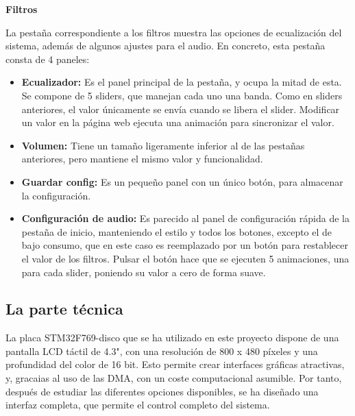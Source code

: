 \textbf{Filtros}

La pestaña correspondiente a los filtros muestra las opciones de ecualización del sistema, además de algunos ajustes para el audio. En concreto, esta pestaña consta de 4 paneles: 
\begin{itemize}
    \item \textbf{Ecualizador:} Es el panel principal de la pestaña, y ocupa la mitad de esta. Se compone de 5 sliders, que manejan cada uno una banda. Como en sliders anteriores, el valor únicamente se envía cuando se libera el slider. Modificar un valor en la página web ejecuta una animación para sincronizar el valor.
    \item \textbf{Volumen:} Tiene un tamaño ligeramente inferior al de las pestañas anteriores, pero mantiene el mismo valor y funcionalidad.
    \item \textbf{Guardar config:} Es un pequeño panel con un único botón, para almacenar la configuración.
    \item \textbf{Configuración de audio:} Es parecido al panel de configuración rápida de la pestaña de inicio, manteniendo el estilo y todos los botones, excepto el de bajo consumo, que en este caso es reemplazado por un botón para restablecer el valor de los filtros. Pulsar el botón hace que se ejecuten 5 animaciones, una para cada slider, poniendo su valor a cero de forma suave.
\end{itemize}

\subsection{La parte técnica}
La placa STM32F769-disco que se ha utilizado en este proyecto dispone de una pantalla LCD táctil de 4.3", con una resolución de 800 x 480 píxeles y una profundidad del color de 16 bit. Esto permite crear interfaces gráficas atractivas, y, gracaias al uso de las DMA, con un coste computacional asumible. Por tanto, después de estudiar las diferentes opciones disponibles, se ha diseñado una interfaz completa, que permite el control completo del sistema.
